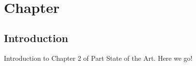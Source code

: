 \chapter{Chapter}
\label{sect:sota_chapter2}

\section{Introduction}

Introduction to Chapter 2 of Part State of the Art. Here we go!